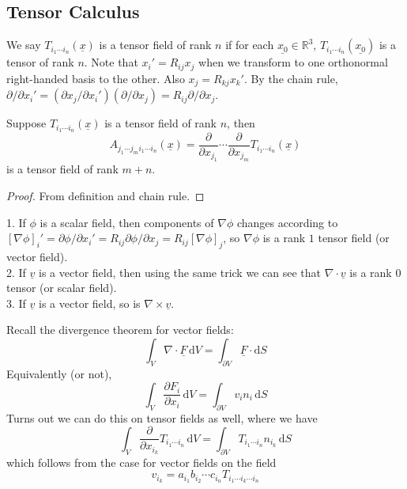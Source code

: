 \subsection{Tensor Calculus}
We say $T_{i_1\cdots i_n}(\underline{x})$ is a tensor field of rank $n$ if for each $\underline{x_0}\in\mathbb R^3$, $T_{i_1\cdots i_n}(\underline{x_0})$ is a tensor of rank $n$.
Note that $x_i'=R_{ij}x_j$ when we transform to one orthonormal right-handed basis to the other.
Also $x_j=R_{kj}x_k'$.
By the chain rule, $\partial/\partial x_i'=(\partial x_j/\partial x_i')(\partial/\partial x_j)=R_{ij}\partial/\partial x_j$.
\begin{proposition}
    Suppose $T_{i_1\cdots i_n}(\underline{x})$ is a tensor field of rank $n$, then
    $$A_{j_1\cdots j_mi_1\cdots i_n}(\underline{x})=\frac{\partial}{\partial x_{j_1}}\cdots\frac{\partial}{\partial x_{j_m}}T_{i_1\cdots i_n}(\underline{x})$$
    is a tensor field of rank $m+n$.
\end{proposition}
\begin{proof}
    From definition and chain rule.
\end{proof}
\begin{example}
    1. If $\phi$ is a scalar field, then components of $\nabla\phi$ changes according to $[\nabla\phi]_i'=\partial\phi/\partial x_i'=R_{ij}\partial\phi/\partial x_j=R_{ij}[\nabla\phi]_j$, so $\nabla\phi$ is a rank $1$ tensor field (or vector field).\\
    2. If $\underline{v}$ is a vector field, then using the same trick we can see that $\nabla\cdot\underline{v}$ is a rank $0$ tensor (or scalar field).\\
    3. If $\underline{v}$ is a vector field, so is $\nabla\times\underline{v}$.
\end{example}
\begin{example}
    Recall the divergence theorem for vector fields:
    $$\int_V\nabla\cdot\underline{F}\,\mathrm dV=\int_{\partial V}\underline{F}\cdot\mathrm dS$$
    Equivalently (or not),
    $$\int_V\frac{\partial F_i}{\partial x_i}\,\mathrm dV=\int_{\partial V}v_in_i\,\mathrm dS$$
    Turns out we can do this on tensor fields as well, where we have
    $$\int_V\frac{\partial}{\partial x_{i_k}}T_{i_1\cdots i_n}\,\mathrm dV=\int_{\partial V}T_{i_1\cdots i_n}n_{i_k}\,\mathrm dS$$
    which follows from the case for vector fields on the field
    $$v_{i_k}=a_{i_1}b_{i_2}\cdots c_{i_n}T_{i_1\cdots i_k\cdots i_n}$$
\end{example}
